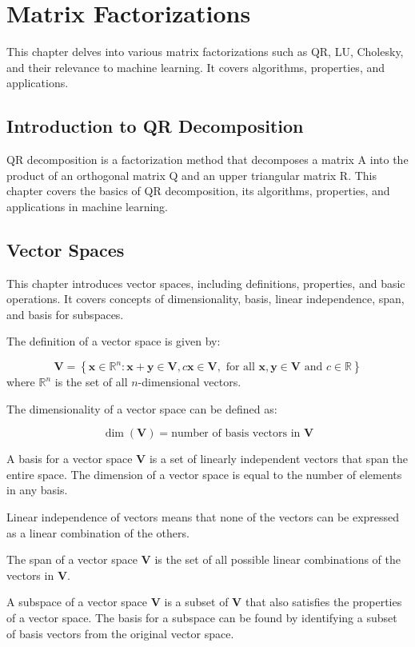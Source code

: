 \documentclass{report}%
\begin{document}
\chapter{Matrix Factorizations}%
This chapter delves into various matrix factorizations such as QR, LU, Cholesky, and their relevance to machine learning. It covers algorithms, properties, and applications.

%
\section{Introduction to QR Decomposition}%
QR decomposition is a factorization method that decomposes a matrix A into the product of an orthogonal matrix Q and an upper triangular matrix R. This chapter covers the basics of QR decomposition, its algorithms, properties, and applications in machine learning.

%
\section*{Vector Spaces}

This chapter introduces vector spaces, including definitions, properties, and basic operations. It covers concepts of dimensionality, basis, linear independence, span, and basis for subspaces.

The definition of a vector space is given by:

$$
 \mathbf{V} = \left\{ \mathbf{x} \in \mathbb{R}^n : \mathbf{x} + \mathbf{y} \in \mathbf{V}, c\mathbf{x} \in \mathbf{V}, \text{ for all } \mathbf{x}, \mathbf{y} \in \mathbf{V} \text{ and } c \in \mathbb{R} \right\}
$$
where $\mathbb{R}^n$ is the set of all $n$-dimensional vectors.

The dimensionality of a vector space can be defined as:

$$
\dim(\mathbf{V}) = \text{number of basis vectors in }\mathbf{V}
$$

A basis for a vector space $\mathbf{V}$ is a set of linearly independent vectors that span the entire space. The dimension of a vector space is equal to the number of elements in any basis.

Linear independence of vectors means that none of the vectors can be expressed as a linear combination of the others.

The span of a vector space $\mathbf{V}$ is the set of all possible linear combinations of the vectors in $\mathbf{V}$.

A subspace of a vector space $\mathbf{V}$ is a subset of $\mathbf{V}$ that also satisfies the properties of a vector space. The basis for a subspace can be found by identifying a subset of basis vectors from the original vector space.
\end{document}
